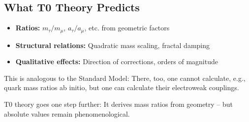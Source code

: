 \subsection{What T0 Theory Predicts}

\begin{itemize}
	\item \textbf{Ratios:} $m_\tau/m_\mu$, $a_\tau/a_\mu$, etc. from geometric factors
	
	\item \textbf{Structural relations:} Quadratic mass scaling, fractal damping
	
	\item \textbf{Qualitative effects:} Direction of corrections, orders of magnitude
\end{itemize}

This is analogous to the Standard Model: There, too, one cannot calculate, e.g., quark mass ratios ab initio, but one can calculate their electroweak couplings.

T0 theory goes one step further: It derives mass ratios from geometry – but absolute values remain phenomenological.


